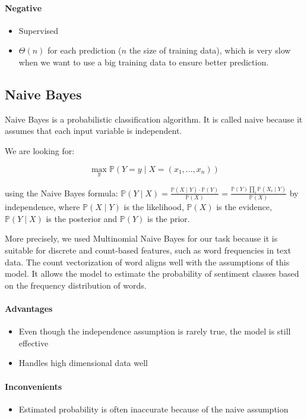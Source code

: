 \documentclass{article}
\begin{document}
\paragraph{Negative} \begin{itemize}
  \item Supervised
  \item $\Theta(n)$ for each prediction ($n$ the size of training data), which is
  very slow when we want to use a big training data to ensure better prediction.
\end{itemize}

\subsection{Naive Bayes}

Naive Bayes is a probabilistic classification algorithm.
It is called naive because it assumes that each input variable is independent.

We are looking for:

$$ \max_{y}\mathbb{P}(Y =y \mid X=(x_1, ..., x_n)) $$

using the Naive Bayes formula: $\mathbb{P}(Y \mid X) = \frac{\mathbb{P}(X\mid Y)\cdot \mathbb{P}(Y)}{\mathbb{P}(X)} = \frac{\mathbb{P}(Y)\prod_{i}^{}\mathbb{P}(X_i\mid Y)}{\mathbb{P}(X)}$
by independence,
where $\mathbb{P}(X\mid Y)$ is the likelihood, $\mathbb{P}(X)$ is the evidence, $\mathbb{P}(Y \mid X)$ is the posterior and $\mathbb{P}(Y)$ is the prior.

More precisely, we used Multinomial Naive Bayes for our task because it is suitable for discrete and count-based features, such as word frequencies in text data. The count vectorization of word aligns well with the assumptions of this model. It allows the model to estimate the probability of sentiment classes based on the frequency distribution of words.

\paragraph{Advantages} \begin{itemize}
\item Even though the independence assumption is rarely true, the model is still effective
\item Handles high dimensional data well
\end{itemize}

\paragraph{Inconvenients} \begin{itemize}
\item Estimated probability is often inaccurate because of the naive assumption
\end{itemize}
\end{document}
